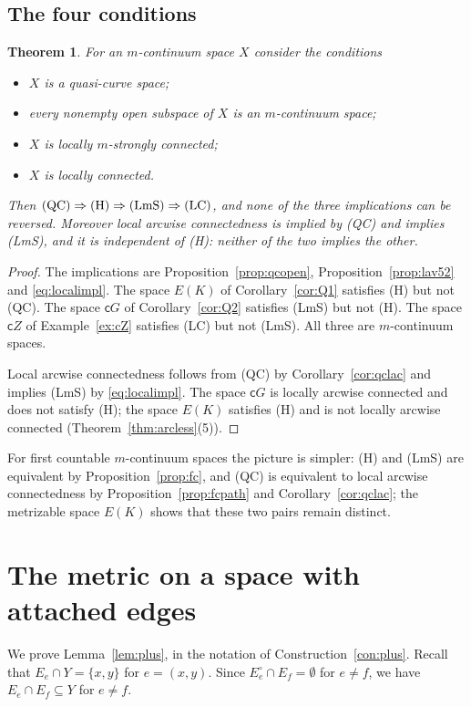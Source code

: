 \documentclass[11pt]{amsart}
\newtheorem{theorem}{Theorem}[section]
\theoremstyle{definition}
\theoremstyle{remark}
\newcommand{\cone}{\mathsf{c}}
\numberwithin{equation}{section}
\begin{document}
\subsection{The four conditions}
\begin{theorem}\label{thm:chain}
For an $m$-continuum space $X$ consider the conditions
\begin{itemize}[leftmargin=4em]
\item[\textup{(QC)}] $X$ is a quasi-curve space;
\item[\textup{(H)}] every nonempty open subspace of $X$ is an $m$-continuum space;
\item[\textup{(LmS)}] $X$ is locally $m$-strongly connected;
\item[\textup{(LC)}] $X$ is locally connected.
\end{itemize}
Then $\textup{(QC)}\Rightarrow\textup{(H)}\Rightarrow\textup{(LmS)}\Rightarrow\textup{(LC)}$, and none of the three implications can be reversed. Moreover local arcwise connectedness is implied by \textup{(QC)} and implies \textup{(LmS)}, and it is independent of \textup{(H)}: neither of the two implies the other.
\end{theorem}
\begin{proof}
The implications are Proposition~\ref{prop:qcopen}, Proposition~\ref{prop:lav52} and \eqref{eq:localimpl}. The space $E(K)$ of Corollary~\ref{cor:Q1} satisfies (H) but not (QC). The space $\cone G$ of Corollary~\ref{cor:Q2} satisfies (LmS) but not (H). The space $\cone Z$ of Example~\ref{ex:cZ} satisfies (LC) but not (LmS). All three are $m$-continuum spaces.

Local arcwise connectedness follows from (QC) by Corollary~\ref{cor:qclac} and implies (LmS) by \eqref{eq:localimpl}. The space $\cone G$ is locally arcwise connected and does not satisfy (H); the space $E(K)$ satisfies (H) and is not locally arcwise connected (Theorem~\ref{thm:arcless}(5)).
\end{proof}
For first countable $m$-continuum spaces the picture is simpler: (H) and (LmS) are equivalent by Proposition~\ref{prop:fc}, and (QC) is equivalent to local arcwise connectedness by Proposition~\ref{prop:fcpath} and Corollary~\ref{cor:qclac}; the metrizable space $E(K)$ shows that these two pairs remain distinct.

\appendix
\section{The metric on a space with attached edges}\label{app:glue}
We prove Lemma~\ref{lem:plus}, in the notation of Construction~\ref{con:plus}. Recall that $E_e\cap Y=\{x,y\}$ for $e=(x,y)$. Since $E_e^\circ\cap E_f=\emptyset$ for $e\ne f$, we have $E_e\cap E_f\subseteq Y$ for $e\neq f$.
\end{document}
